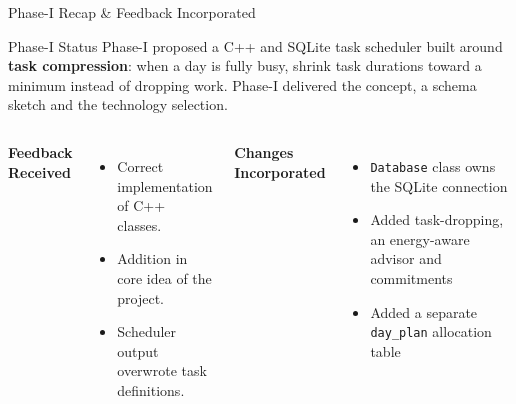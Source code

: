 \documentclass[aspectratio=169,11pt]{beamer}
\newcommand{\smallnote}[1]{%
\vspace{0.08cm}
{\scriptsize\color{GEUGrey}#1}
}
\begin{document}
\begin{frame}{Phase-I Recap \& Feedback Incorporated}

\begin{block}{Phase-I Status}
\small
Phase-I proposed a C++ and SQLite task scheduler built around
\textbf{task compression}: when a day is fully busy, shrink task durations
toward a minimum instead of dropping work. Phase-I delivered the
concept, a schema sketch and the technology selection.
\end{block}

\vspace{2mm}

\begin{columns}[T,totalwidth=\textwidth]


\textbf{\color{GEUBlue}Feedback Received}

\begin{itemize}\itemsep2pt
\small
\item Correct implementation of C++ classes.
\item Addition in core idea of the project.
\item Scheduler output overwrote task definitions.
\end{itemize}


\textbf{\color{GEUBlue}Changes Incorporated}

\begin{itemize}\itemsep2pt
\small
\item \texttt{Database} class owns the SQLite connection
\item Added task-dropping, an energy-aware advisor and commitments
\item Added a separate \texttt{day\_plan} allocation table
\end{itemize}

\end{columns}

\vfill

\smallnote{
}

\end{frame}
\end{document}
